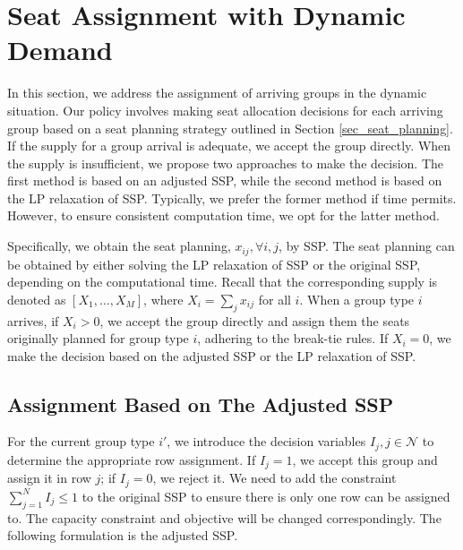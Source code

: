 \section{Seat Assignment with Dynamic Demand}\label{sec_dynamic}

In this section, we address the assignment of arriving groups in the dynamic situation. Our policy involves making seat allocation decisions for each arriving group based on a seat planning strategy outlined in Section \ref{sec_seat_planning}. If the supply for a group arrival is adequate, we accept the group directly. When the supply is insufficient, we propose two approaches to make the decision. The first method is based on an adjusted SSP, while the second method is based on the LP relaxation of SSP. Typically, we prefer the former method if time permits. However, to ensure consistent computation time, we opt for the latter method.


Specifically, we obtain the seat planning, $x_{ij}, \forall i,j$, by SSP. The seat planning can be obtained by either solving the LP relaxation of SSP or the original SSP, depending on the computational time. Recall that the corresponding supply is denoted as $[X_1, \ldots, X_M]$, where $X_i = \sum_{j} x_{ij}$ for all $i$. When a group type $i$ arrives, if $X_i > 0$, we accept the group directly and assign them the seats originally planned for group type $i$, adhering to the break-tie rules. If $X_i = 0$, we make the decision based on the adjusted SSP or the LP relaxation of SSP.

\subsection{Assignment Based on The Adjusted SSP}
For the current group type $i{'}$, we introduce the decision variables $I_j, j \in \mathcal{N}$ to determine the appropriate row assignment. If $I_j =1$, we accept this group and assign it in row $j$; if $I_j =0$, we reject it. We need to add the constraint $\sum_{j=1}^{N} I_j \leq 1$ to the original SSP to ensure there is only one row can be assigned to. The capacity constraint and objective will be changed correspondingly. The following formulation is the adjusted SSP.

